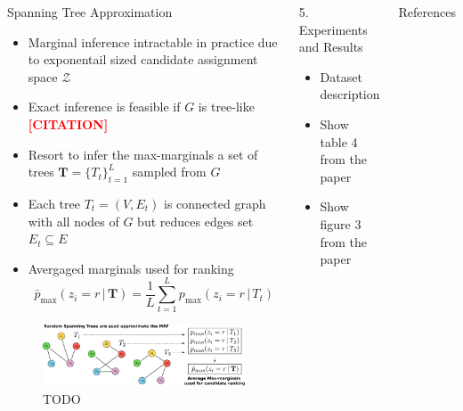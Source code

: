 \documentclass{beamer}
\newcommand{\todocite}{\textcolor{red}{\textbf{[CITATION]}}}
\begin{document}
\begin{frame}{}
\begin{columns}[T]
    \begin{block}{{\normalsize Spanning Tree Approximation}}
    \begin{itemize}
        \item Marginal inference intractable in practice due to exponentail sized candidate assignment space $\mathcal{Z}$
        \item Exact inference is feasible if $G$ is tree-like \todocite
        \item Resort to infer the max-marginals a set of trees $\mathbf{T}=\{T_t\}_{t=1}^L$ sampled from $G$
        \item Each tree $T_t=(V,E_t)$ is connected graph with all nodes of $G$ but reduces edges set $E_t\subseteq E$
        \item Avergaged marginals used for ranking
            \begin{equation}
                \bar{p}_{\max}(z_i=r\,|\,\mathbf{T})=\frac{1}{L}\sum_{t=1}^L p_{\max}(z_i=r\,|\,T_t)
            \end{equation}
    \end{itemize}
    \begin{figure}
        \centering
        \includegraphics[width=\textwidth]{images/random_spanning_trees.pdf}
        \caption{TODO}
    \end{figure}
    \end{block}


    \begin{block}{{\normalsize 5. Experiments and Results}}
    \begin{itemize}
        \item Dataset description
        \item Show table 4 from the paper
        \item Show figure 3 from the paper
    \end{itemize}
    \end{block}



\vfill

\begin{block}{\small References}
\end{block}

\end{columns}

\vfill

\end{frame}
\end{document}
